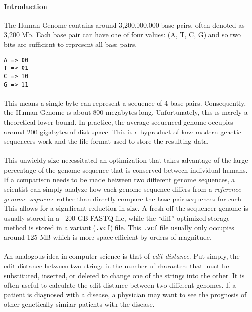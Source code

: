 \paragraph{Introduction}
The Human Genome contains around 3,200,000,000 base pairs, often denoted as 3,200 Mb. Each base pair can have one of four values: (A, T, C, G) and so two bits are sufficient to represent all base pairs.

\begin{verbatim}
A => 00
T => 01
C => 10
G => 11
\end{verbatim}

\paragraph{}
This means a single byte can represent a sequence of 4 base-pairs. Consequently, the Human Genome is about 800 megabytes long. Unfortunately, this is merely a theoretical lower bound. In practice, the average sequenced genome occupies around 200 gigabytes of disk space. This is a byproduct of how modern genetic sequencers work and the file format used to store the resulting data.

\paragraph{}
This unwieldy size necessitated an optimization that takes advantage of the large percentage of the genome sequence that is conserved between individual humans. If a comparison needs to be made between two different genome sequences, a scientist can simply analyze how each genome sequence differs from a \textit{reference genome sequence} rather than directly compare the base-pair sequences for each. This allows for a significant reduction in size. A fresh-off-the-sequencer genome is usually stored in a ~200 GB FASTQ file, while the ``diff'' optimized storage method is stored in a variant (\texttt{.vcf}) file. This \texttt{.vcf} file usually only occupies around 125 MB which is more space efficient by orders of magnitude.

\paragraph{}
An analogous idea in computer science is that of \textit{edit distance}. Put simply, the edit distance between two strings is the number of characters that must be substituted, inserted, or deleted to change one of the strings into the other. It is often useful to calculate the edit distance between two different genomes. If a patient is diagnosed with a disease, a physician may want to see the prognosis of other genetically similar patients with the disease.

